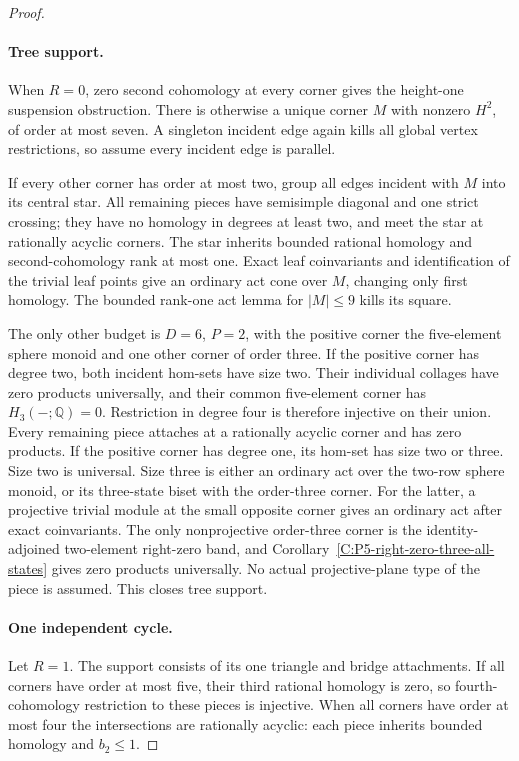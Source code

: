 \begin{proof}
\paragraph{Tree support.}
When $R=0$, zero second cohomology at every corner gives
the height-one suspension obstruction.  There is otherwise
a unique corner $M$ with nonzero $H^2$, of order at most
seven.  A singleton incident edge again kills all global
vertex restrictions, so assume every incident edge is parallel.

If every other corner has order at most two, group all
edges incident with $M$ into its central star.  All remaining
pieces have semisimple diagonal and one strict crossing;
they have no homology in degrees at least two, and meet
the star at rationally acyclic corners.  The star inherits
bounded rational homology and second-cohomology rank at
most one.  Exact leaf coinvariants and identification of
the trivial leaf points give an ordinary act cone over
$M$, changing only first homology.  The bounded rank-one
act lemma for $|M|\leq9$ kills its square.

The only other budget is $D=6$, $P=2$, with the positive
corner the five-element sphere monoid and one other corner
of order three.  If the positive corner has degree two,
both incident hom-sets have size two.  Their individual
collages have zero products universally, and their common
five-element corner has $H_3(-;\mathbb Q)=0$.
Restriction in degree four is therefore injective on
their union.  Every remaining piece attaches at a
rationally acyclic corner and has zero products.
If the positive corner has degree one, its hom-set has
size two or three.  Size two is universal.  Size three
is either an ordinary act over the two-row sphere monoid,
or its three-state biset with the order-three corner.
For the latter, a projective trivial module at the small
opposite corner gives an ordinary act after exact
coinvariants.  The only nonprojective order-three corner
is the identity-adjoined two-element right-zero band,
and Corollary~\ref{C:P5-right-zero-three-all-states}
gives zero products universally.  No actual
projective-plane type of the piece is assumed.
This closes tree support.

\paragraph{One independent cycle.}
Let $R=1$.  The support consists of its one triangle
and bridge attachments.  If all corners have order at
most five, their third rational homology is zero, so
fourth-cohomology restriction to these pieces is injective.
When all corners have order at most four the intersections
are rationally acyclic: each piece inherits bounded homology
and $b_2\leq1$.


\end{proof}
